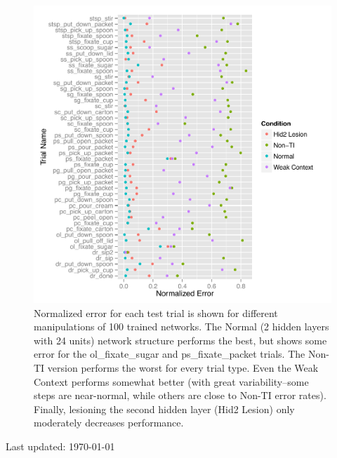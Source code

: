 \documentclass[10pt,letterpaper]{article}
\numberwithin{equation}{section}
\begin{document}
\begin{figure}[h]
  \centering
  \includegraphics[width=\textwidth]{figs/test_error}
  \caption{Normalized error for each test trial is shown for different manipulations of 100 trained networks. The Normal (2 hidden layers with 24 units) network structure performs the best, but shows some error for the ol\_fixate\_sugar and ps\_fixate\_packet trials. The Non-TI version performs the worst for every trial type. Even the Weak Context performs somewhat better (with great variability--some steps are near-normal, while others are close to Non-TI error rates). Finally, lesioning the second hidden layer (Hid2 Lesion) only moderately decreases performance.}
  \label{fig:test_error}
\end{figure}


\clearpage




\begin{center}
  \begin{footnotesize}
    Last updated: \today 
  \end{footnotesize}
\end{center}
\end{document}
